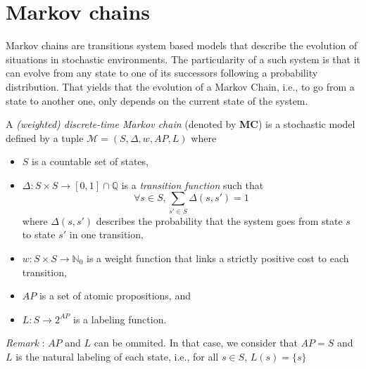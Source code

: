 \section{Markov chains}
Markov chains are transitions system based models that describe the evolution of situations in stochastic environments.
The particularity of a such system is that it can evolve from any state to one of its successors following a probability distribution.
That yields that the evolution of a Markov Chain, i.e., to go from a state to another one, only depends on the current state of the system.
\begin{definition}
  A \textit{(weighted) discrete-time Markov chain} (denoted by \textbf{MC}) is a stochastic model defined by a tuple $\mathcal{M}=(S, \Delta, w, AP, L)$ where
	\begin{itemize}
		\item $S$ is a countable set of states,
		\item $\Delta: S \times S \rightarrow [0,1] \cap \mathbb{Q}$ is a  \textit{transition function} such that \[\forall s \in S, \sum_{s' \in S}\Delta(s, s')= 1\]
		where $\Delta(s, s')$ describes the probability that the system goes from state $s$ to state $s'$ in one transition,
    \item $w: S \times S \rightarrow \mathbb{N}_0$ %
      is a weight function that links a strictly positive cost to each transition,
    \item $AP$ is a set of atomic propositions, and
    \item $L: S \rightarrow 2^{AP}$ is a labeling function.
	\end{itemize}
  \textit{Remark }: $AP$ and $L$ can be ommited. In that case, we consider that $AP = S$ and $L$ is the natural labeling of each state, i.e., for all $s \in S$, $L(s) = \{s\}$
\end{definition}

